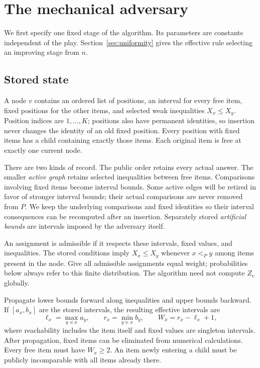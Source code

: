 \section{The mechanical adversary}
\label{sec:algorithm}

We first specify one fixed stage of the algorithm. Its parameters are
constants independent of the play. Section~\ref{sec:uniformity} gives the
effective rule selecting an improving stage from $n$.

\subsection{Stored state}

A node $v$ contains an ordered list of positions, an interval for every free
item, fixed positions for the other items, and selected weak inequalities
$X_x\leq X_y$. Position indices are $1,\ldots,K$; positions also have
permanent identities, so insertion never changes the identity of an old
fixed position. Every position with fixed items has a child containing exactly
those items. Each original item is free at exactly one current node.

There are two kinds of record. The public order retains every actual answer.
The smaller \emph{active graph} retains selected inequalities between free
items. Comparisons involving fixed items become interval bounds. Some active
edges will be retired in favor of stronger interval bounds; their actual
comparisons are never removed from $P$.
We keep the underlying comparisons and fixed identities so their interval
consequences can be recomputed after an insertion. Separately stored
\emph{artificial bounds} are intervals imposed by the adversary itself.

An assignment is admissible if it respects these intervals, fixed values,
and inequalities. The stored conditions imply $X_x\leq X_y$ whenever
$x<_P y$ among items present in the node. Give all admissible assignments
equal weight; probabilities below always refer to this finite distribution.
The algorithm need not compute $Z_v$ globally.

Propagate lower bounds forward along inequalities and upper bounds backward.
If $[a_x,b_x]$ are the stored intervals, the resulting effective intervals are
\begin{equation}
\ell_x=\max_{y\preceq x}a_y,\qquad
r_x=\min_{y\succeq x}b_y,\qquad W_x=r_x-\ell_x+1,
\label{eq:effective}
\end{equation}
where reachability includes the item itself and fixed values are singleton
intervals. After propagation, fixed items can be eliminated from numerical
calculations. Every free item must have $W_x\geq2$.
An item newly entering a child must be publicly incomparable with all items
already there.

